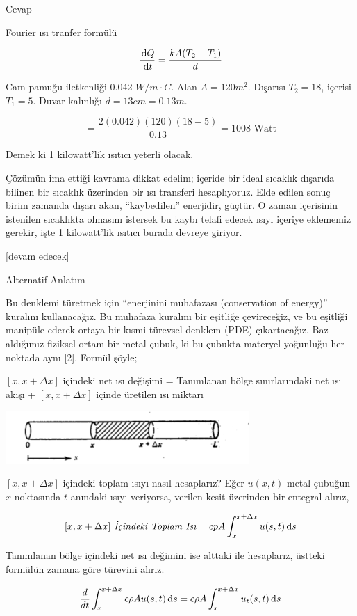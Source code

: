 \documentclass[12pt,fleqn]{article}\usepackage{../../common}
\begin{document}
Cevap

Fourier ısı tranfer formülü

$$
\frac{\,\mathrm{d} Q}{\,\mathrm{d} t} = \frac{k A (T_2 - T_1)}{d}
$$

Cam pamuğu iletkenliği 0.042 $W / m \cdot C$. Alan $A = 120 m^2$. Dışarısı $T_2
= 18$, içerisi $T_1 = 5$. Duvar kalınlığı $d = 13 cm = 0.13 m$.

$$
= \frac{2 (0.042) (120) (18-5)}{0.13} = 1008 \textrm{ Watt}
$$

Demek ki 1 kilowatt'lik ısıtıcı yeterli olacak.

Çözümün ima ettiği kavrama dikkat edelim; içeride bir ideal sıcaklık dışarıda
bilinen bir sıcaklık üzerinden bir ısı transferi hesaplıyoruz. Elde edilen sonuç
birim zamanda dışarı akan, ``kaybedilen'' enerjidir, güçtür. O zaman içerisinin
istenilen sıcaklıkta olmasını istersek bu kaybı telafi edecek ısıyı içeriye
eklememiz gerekir, işte 1 kilowatt'lik ısıtıcı burada devreye giriyor.


[devam edecek]

Alternatif Anlatım

Bu denklemi türetmek için ``enerjinini muhafazası (conservation of
energy)'' kuralını kullanacağız. Bu muhafaza kuralını bir eşitliğe
çevireceğiz, ve bu eşitliği manipüle ederek ortaya bir kısmi türevsel
denklem (PDE) çıkartacağız. Baz aldığımız fiziksel ortam bir metal çubuk,
ki bu çubukta materyel yoğunluğu her noktada aynı [2].  Formül şöyle;

$[x,x+\Delta x]$ içindeki net ısı değişimi = Tanımlanan bölge
sınırlarındaki net ısı akışı + $[x,x+\Delta x]$ içinde üretilen ısı miktarı

\includegraphics[height=2cm]{heat_1.png}

$[x,x+\Delta x]$ içindeki toplam ısıyı nasıl hesaplarız? Eğer $u(x,t)$
metal çubuğun $x$ noktasında $t$ anındaki ısıyı veriyorsa, verilen kesit
üzerinden bir entegral alırız,

$$
[x,x+\Delta x] \textit{ İçindeki Toplam Isı} = 
cpA \int _{ x}^{x+\Delta x}u(s,t) \,\mathrm{d} s
$$

Tanımlanan bölge içindeki net ısı değimini ise alttaki ile hesaplarız,
üstteki formülün zamana göre türevini alırız. 

$$
\frac{d}{dt} \int _{ x}^{x+\Delta x} c\rho A u(s,t) \,\mathrm{d} s = 
c\rho A  \int _{ x}^{x+\Delta x} u_t(s,t) \,\mathrm{d} s
$$
\end{document}
